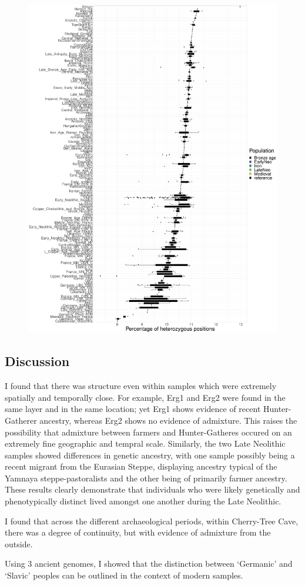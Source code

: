 \begin{figure}[htp]
    \centering
    \includegraphics[width=1.0\textwidth]{../images/chapter4/het_per_pop.pdf}
    \caption{}
    \label{fig:het_per_pop}
\end{figure}

\subsection{Discussion}

I found that there was structure even within samples which were extremely spatially and temporally close. For example, Erg1 and Erg2 were found in the same layer and in the same location; yet Erg1 shows evidence of recent Hunter-Gatherer ancestry, whereas Erg2 shows no evidence of admixture. This raises the possibility that admixture between farmers and Hunter-Gatheres occured on an extremely fine geographic and tempral scale. Similarly, the two Late Neolithic samples showed differences in genetic ancestry, with one sample possibly being a recent migrant from the Eurasian Steppe, displaying ancestry typical of the Yamnaya steppe-pastoralists and the other being of primarily farmer ancestry. These results clearly demonstrate that individuals who were likely genetically and phenotypically distinct lived amongst one another during the Late Neolithic. 

I found that across the different archaeological periods, within Cherry-Tree Cave, there was a degree of continuity, but with evidence of admixture from the outside. 

Using 3 ancient genomes, I showed that the distinction between `Germanic' and `Slavic' peoples can be outlined in the context of modern samples.
